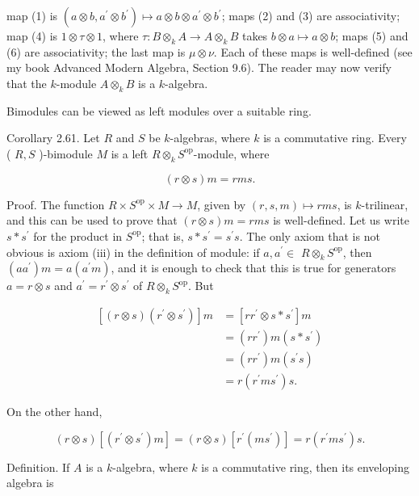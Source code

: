\documentclass[10pt]{article}
\begin{document}
map (1) is $\left(a \otimes b, a^{\prime} \otimes b^{\prime}\right) \mapsto a \otimes b \otimes a^{\prime} \otimes b^{\prime}$; maps (2) and (3) are associativity; map (4) is $1 \otimes \tau \otimes 1$, where $\tau: B \otimes_{k} A \rightarrow A \otimes_{k} B$ takes $b \otimes a \mapsto a \otimes b$; maps (5) and (6) are associativity; the last map is $\mu \otimes \nu$. Each of these maps is well-defined (see my book Advanced Modern Algebra, Section 9.6). The reader may now verify that the $k$-module $A \otimes_{k} B$ is a $k$-algebra.

Bimodules can be viewed as left modules over a suitable ring.

Corollary 2.61. Let $R$ and $S$ be $k$-algebras, where $k$ is a commutative ring. Every ( $R, S$ )-bimodule $M$ is a left $R \otimes_{k} S^{\mathrm{op}}$-module, where

$$
(r \otimes s) m=r m s .
$$

Proof. The function $R \times S^{\mathrm{op}} \times M \rightarrow M$, given by $(r, s, m) \mapsto r m s$, is $k$-trilinear, and this can be used to prove that $(r \otimes s) m=r m s$ is well-defined. Let us write $s * s^{\prime}$ for the product in $S^{\mathrm{op}}$; that is, $s * s^{\prime}=s^{\prime} s$. The only axiom that is not obvious is axiom (iii) in the definition of module: if $a, a^{\prime} \in$ $R \otimes_{k} S^{\mathrm{op}}$, then $\left(a a^{\prime}\right) m=a\left(a^{\prime} m\right)$, and it is enough to check that this is true for generators $a=r \otimes s$ and $a^{\prime}=r^{\prime} \otimes s^{\prime}$ of $R \otimes_{k} S^{\mathrm{op}}$. But

$$
\begin{aligned}
{\left[(r \otimes s)\left(r^{\prime} \otimes s^{\prime}\right)\right] m } & =\left[r r^{\prime} \otimes s * s^{\prime}\right] m \\
& =\left(r r^{\prime}\right) m\left(s * s^{\prime}\right) \\
& =\left(r r^{\prime}\right) m\left(s^{\prime} s\right) \\
& =r\left(r^{\prime} m s^{\prime}\right) s .
\end{aligned}
$$

On the other hand,

$$
(r \otimes s)\left[\left(r^{\prime} \otimes s^{\prime}\right) m\right]=(r \otimes s)\left[r^{\prime}\left(m s^{\prime}\right)\right]=r\left(r^{\prime} m s^{\prime}\right) s .
$$

Definition. If $A$ is a $k$-algebra, where $k$ is a commutative ring, then its enveloping algebra is
\end{document}
